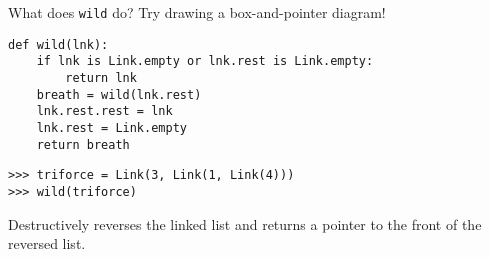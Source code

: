 \begin{blocksection}
\question What does \lstinline$wild$ do? Try drawing a box-and-pointer diagram!

\begin{lstlisting}
def wild(lnk):
    if lnk is Link.empty or lnk.rest is Link.empty:
        return lnk
    breath = wild(lnk.rest)
    lnk.rest.rest = lnk
    lnk.rest = Link.empty
    return breath
\end{lstlisting}

\begin{lstlisting}
>>> triforce = Link(3, Link(1, Link(4)))
>>> wild(triforce)
\end{lstlisting}

\begin{solution}[1in]
Destructively reverses the linked list and returns a pointer to the front of the reversed list.
\end{solution}
\end{blocksection}
